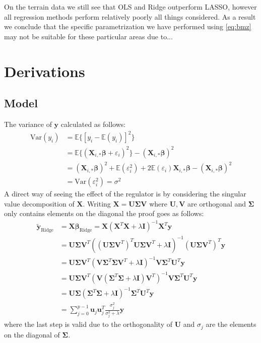 \documentclass[%
reprint,
amsmath,amssymb,
aps,
pra,
]{revtex4-2}
\begin{document}
On the terrain data we still see that OLS and Ridge outperform LASSO, however all regression methods perform relatively poorly all things considered. As a result we conclude that the specific parametrization we have performed using \eqref{eq:bmz} may not be suitable for these particular areas due to...






\appendix
\section{Derivations}
\label{Appendix:Derivations}
\subsection{Model}
The variance of $\bm y$ calculated as follows:
\begin{align*}
	\text{Var}(y_i)&=\mathbb{E}\{[y_i-\mathbb{E}(y_i)]^2\}\\
	&=\mathbb{E}\{(\bm X_{i,*}\bm\beta+\varepsilon_i)^2\}-(\bm X_{i,*}\bm\beta)^2\\
	&=(\bm X_{i,*}\bm\beta)^2+\mathbb{E}(\varepsilon_i^2)+2\mathbb{E}(\varepsilon_i)\bm X_{i,*}\bm\beta-(\bm X_{i,*}\bm\beta)^2\\
	&=\text{Var}(\varepsilon_i^2)=\sigma^2
\end{align*}
A direct way of seeing the effect of the regulator is by considering the singular value decomposition of $\bm X$. Writing $\bm X=\bm U\bm \Sigma\bm V$ where $\bm U,\bm V$ are orthogonal and $\bm \Sigma$ only contains elements on the diagonal the proof goes as follows:
\begin{align*}
	\tilde{\bm{y}}_\text{Ridge}&=\bm{X\beta}_\text{Ridge}=\bm{X}(\bm{X}^T\bm{X}+\lambda\bm I)^{-1}\bm{X}^T\bm{y}\\
	&=\bm{U\Sigma V}^T((\bm{U\Sigma V}^T)^T\bm{U\Sigma V}^T+\lambda\bm I)^{-1}(\bm{U\Sigma V}^T)^T\bm{y}\\
	&=\bm{U\Sigma V}^T(\bm{V}\bm{\Sigma}^T\bm{\Sigma}\bm{V}^T+\lambda\bm I)^{-1}\bm{V}\bm{\Sigma}^T\bm{U}^T\bm{y}\\
	&=\bm{U\Sigma V}^T(\bm{V}({\bm\Sigma}^T\bm{\Sigma}+\lambda\bm I)\bm{V}^T)^{-1}\bm{V}\bm{\Sigma}^T\bm{U}^T\bm{y}\\
	&=\bm{U\Sigma }({\bm\Sigma}^T\bm{\Sigma}+\lambda\bm I)^{-1}\bm{\Sigma}^T\bm{U}^T\bm{y}\\
	&=\sum_{j=0}^{p-1}\bm{u}_j\bm{u}_j^T\frac{\sigma_j^2}{\sigma_j^2+\lambda}\bm{y}
\end{align*}
where the last step is valid due to the orthogonality of $\bm U$ and $\sigma_j$ are the elements on the diagonal of $\bm\Sigma$.
\end{document}
